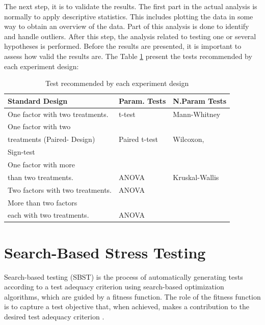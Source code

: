 The next step, it is to validate the results. The first part in the actual analysis is normally to apply descriptive statistics. This includes plotting the data in some way to obtain an overview of the data. Part of this analysis is done to identify and handle outliers. After this step, the analysis related to testing one or several hypotheses is performed. Before the results are presented, it is important to assess how valid the results are. The Table \ref{tab:rec} present the tests recommended by each experiment design:

\begin{table}[]
\centering
\caption{Test recommended by each experiment design}
\label{tab:rec}
\begin{tabular}{|l|l|l|}
\hline
\rowcolor[HTML]{FFCCC9} 
\textbf{Standard Design}                        & \textbf{Param. Tests} & \textbf{N.Param Tests} \\ \hline
One factor with two treatments.                 & t-test                    & Mann-Whitney                  \\ \hline
One factor with two \\ treatments (Paired- Design) & Paired t-test             & Wilcoxon,\\ Sign-test            \\ \hline
One factor with more\\  than two treatments.       & ANOVA                     & Kruskal-Wallis                \\ \hline
Two factors with two treatments.                & ANOVA                     &                               \\ \hline
More than two factors\\ each with two treatments. & ANOVA                     &                               \\ \hline
\end{tabular}
\end{table}



\section{Search-Based Stress Testing}

Search-based testing (SBST) is the process of automatically
generating tests according to a test adequacy criterion using search-based optimization algorithms, which are guided by a fitness function. The role of the fitness function is to capture a test objective that, when achieved, makes a contribution to the desired test adequacy criterion \citep{Harman2010}. 


